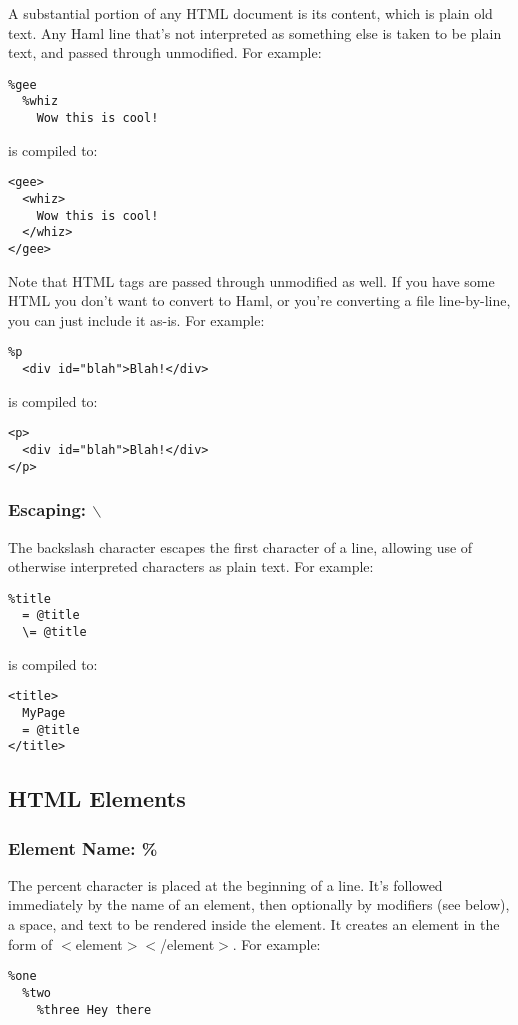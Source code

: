 \documentclass[10pt]{article}
\begin{document}
 A substantial portion of any HTML document is its content, which is plain old text. Any Haml line that’s not interpreted as something else is taken to be plain text, and passed through unmodified. For example:
\begin{verbatim}
%gee
  %whiz
    Wow this is cool!
\end{verbatim}


 is compiled to:
\begin{verbatim}
<gee>
  <whiz>
    Wow this is cool!
  </whiz>
</gee>
\end{verbatim}


 Note that HTML tags are passed through unmodified as well. If you have some HTML you don’t want to convert to Haml, or you’re converting a file line-by-line, you can just include it as-is. For example:
\begin{verbatim}
%p
  <div id="blah">Blah!</div>
\end{verbatim}


 is compiled to:
\begin{verbatim}
<p>
  <div id="blah">Blah!</div>
</p>
\end{verbatim}
\subsubsection*{Escaping: $\backslash$}


 The backslash character escapes the first character of a line, allowing use of otherwise interpreted characters as plain text. For example:
\begin{verbatim}
%title
  = @title
  \= @title
\end{verbatim}


 is compiled to:
\begin{verbatim}
<title>
  MyPage
  = @title
</title>
\end{verbatim}
\subsection*{HTML Elements}
\subsubsection*{Element Name: \%}


 The percent character is placed at the beginning of a line. It’s followed immediately by the name of an element, then optionally by modifiers (see below), a space, and text to be rendered inside the element. It creates an element in the form of $<$element$>$$<$/element$>$. For example:
\begin{verbatim}
%one
  %two
    %three Hey there
\end{verbatim}
\end{document}
